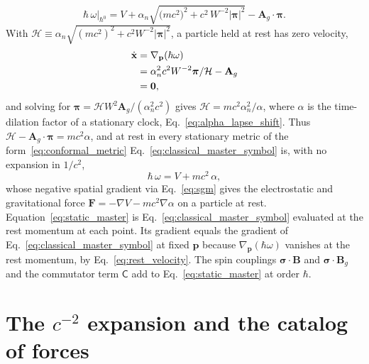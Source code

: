\documentclass[aps,prd,onecolumn,tightenlines,nofootinbib,notitlepage,11pt,floatfix]{revtex4-2}
\theoremstyle{indentedtheorem}
\begin{document}
\begin{equation}
    \hbar\,\omega\big|_{\hbar^0} = V + \alpha_n\sqrt{\big(mc^2\big)^2 + c^2\,W^{-2}|\boldsymbol{\pi}|^2} - \mathbf{A}_g\cdot\boldsymbol{\pi} .
    \label{eq:classical_master_symbol}
\end{equation}
With $\mathcal{H} \equiv \alpha_n\sqrt{(mc^2)^2+c^2W^{-2}|\boldsymbol{\pi}|^2}$, a particle held at rest has zero velocity,
\begin{align}
    \dot{\mathbf{x}} &= \nabla_{\mathbf{p}}(\hbar\omega) \notag\\
    &= \alpha_n^2 c^2 W^{-2}\boldsymbol{\pi}/\mathcal{H} - \mathbf{A}_g \notag\\
    &= \mathbf{0} ,
    \label{eq:rest_velocity}
\end{align}
and solving for $\boldsymbol{\pi} = \mathcal{H}W^2\mathbf{A}_g/(\alpha_n^2 c^2)$ gives $\mathcal{H} = mc^2\alpha_n^2/\alpha$, where $\alpha$ is the time-dilation factor of a stationary clock, Eq.~\eqref{eq:alpha_lapse_shift}. Thus $\mathcal{H} - \mathbf{A}_g\cdot\boldsymbol{\pi} = mc^2\alpha$, and at rest in every stationary metric of the form~\eqref{eq:conformal_metric} Eq.~\eqref{eq:classical_master_symbol} is, with no expansion in $1/c^2$,
\begin{equation}
    \hbar\,\omega = V + mc^2\,\alpha ,
    \label{eq:static_master}
\end{equation}
whose negative spatial gradient via Eq.~\eqref{eq:sgm} gives the electrostatic and gravitational force $\mathbf{F} = -\nabla V - mc^2\nabla\alpha$ on a particle at rest. Equation~\eqref{eq:static_master} is Eq.~\eqref{eq:classical_master_symbol} evaluated at the rest momentum at each point. Its gradient equals the gradient of Eq.~\eqref{eq:classical_master_symbol} at fixed $\mathbf{p}$ because $\nabla_{\mathbf{p}}(\hbar\omega)$ vanishes at the rest momentum, by Eq.~\eqref{eq:rest_velocity}. The spin couplings $\boldsymbol{\sigma}\cdot\mathbf{B}$ and $\boldsymbol{\sigma}\cdot\mathbf{B}_g$ and the commutator term $\mathsf{C}$ add to Eq.~\eqref{eq:static_master} at order $\hbar$.

\section{The \texorpdfstring{$c^{-2}$}{1/c\texttwosuperior} expansion and the catalog of forces}
\label{sec:expansion_orders}
\end{document}
